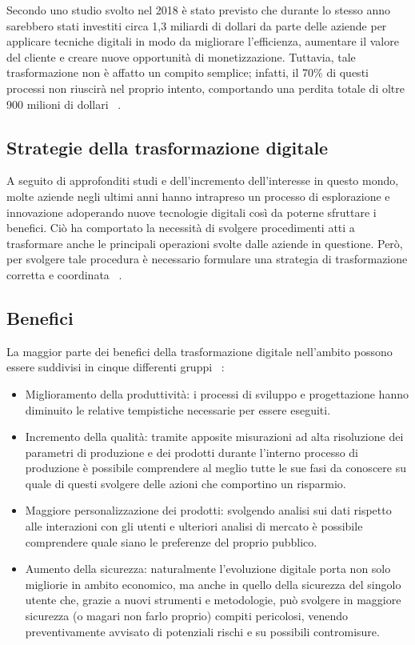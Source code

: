 Secondo uno studio svolto nel 2018 è stato previsto che durante lo stesso anno sarebbero stati investiti circa 1,3 miliardi di dollari da parte delle aziende per applicare tecniche digitali in modo da migliorare l'efficienza, aumentare il valore del cliente e creare nuove opportunità di monetizzazione. Tuttavia, tale trasformazione non è affatto un compito semplice; infatti, il 70\% di questi processi non riuscirà nel proprio intento, comportando  una perdita totale di oltre 900 milioni di dollari ~\cite{forbes_digital_transformation_fail}.

\subsection{Strategie della trasformazione digitale}

A seguito di approfonditi studi e dell'incremento dell'interesse in questo mondo, molte aziende negli ultimi anni hanno intrapreso un processo di esplorazione e innovazione adoperando nuove tecnologie digitali così da poterne sfruttare i benefici. Ciò ha comportato la necessità di svolgere procedimenti atti a trasformare anche le principali operazioni svolte dalle aziende in questione. Però, per svolgere tale procedura è necessario formulare una strategia di trasformazione corretta e coordinata ~\cite{digital_transformation_strategies}.

\subsection{Benefici}

La maggior parte dei benefici della trasformazione digitale nell'ambito possono essere suddivisi in cinque differenti gruppi ~\cite{sciencedirect_digital_transformation_benefits}:
\begin{itemize}
    \item Miglioramento della produttività: i processi di sviluppo e progettazione hanno diminuito le relative tempistiche necessarie per essere eseguiti.
    \item Incremento della qualità: tramite apposite misurazioni ad alta risoluzione dei parametri di produzione e dei prodotti durante l'interno processo di produzione è possibile comprendere al meglio tutte le sue fasi da conoscere su quale di questi svolgere delle azioni che comportino un risparmio.
    \item Maggiore personalizzazione dei prodotti: svolgendo analisi sui dati rispetto alle interazioni con gli utenti e ulteriori analisi di mercato è possibile comprendere quale siano le preferenze del proprio pubblico.
    \item Aumento della sicurezza: naturalmente l’evoluzione digitale porta non solo migliorie in ambito economico, ma anche in quello della sicurezza del singolo utente che, grazie a nuovi strumenti e metodologie, può svolgere in maggiore sicurezza (o magari non farlo proprio) compiti pericolosi, venendo preventivamente avvisato di potenziali rischi e su possibili contromisure.
\end{itemize}

